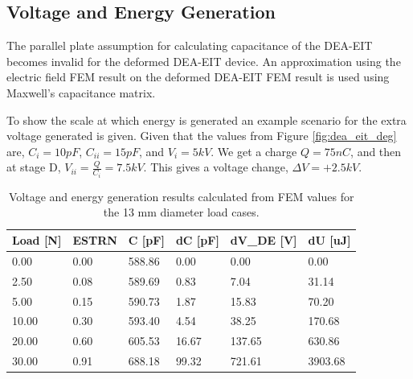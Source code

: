 \subsection{Voltage and Energy Generation}
\label{subsec:Voltage and Energy Generation}
The parallel plate assumption for calculating capacitance of the DEA-EIT becomes invalid for the deformed DEA-EIT device. An approximation using the electric field FEM result on the deformed DEA-EIT FEM result is used using Maxwell's capacitance matrix.

To show the scale at which energy is generated an example scenario for the extra voltage generated is given. Given that the values from Figure \ref{fig:dea_eit_deg} are, $C_i = 10 pF$, $C_{ii} = 15 pF$, and $V_i = 5 kV$. We get a charge $Q = 75 nC$, and then at stage D, $V_{ii} = \frac{Q}{C_{i}} = 7.5 kV$. This gives a voltage change, $\Delta V = +2.5 kV$. 

\begin{table}[H]
	\centering
	\label{tab:volt-energy-gen-d13mm}
	\caption{Voltage and energy generation results calculated from FEM values for the 13 mm diameter load cases.}
	\vspace{0.3cm}
	\begin{tabular}{llllll}
		\textbf{Load {[}N{]}} & \textbf{ESTRN} & \textbf{C {[}pF{]}} & \textbf{dC {[}pF{]}} & \textbf{dV\_DE {[}V{]}} & \textbf{dU {[}uJ{]}} \\ \hline
		0.00  & 0.00 & 588.86 & 0.00  & 0.00   & 0.00    \\
		2.50  & 0.08 & 589.69 & 0.83  & 7.04   & 31.14   \\
		5.00  & 0.15 & 590.73 & 1.87  & 15.83  & 70.20   \\
		10.00 & 0.30 & 593.40 & 4.54  & 38.25  & 170.68  \\
		20.00 & 0.60 & 605.53 & 16.67 & 137.65 & 630.86  \\
		30.00 & 0.91 & 688.18 & 99.32 & 721.61 & 3903.68
	\end{tabular}
\end{table}


